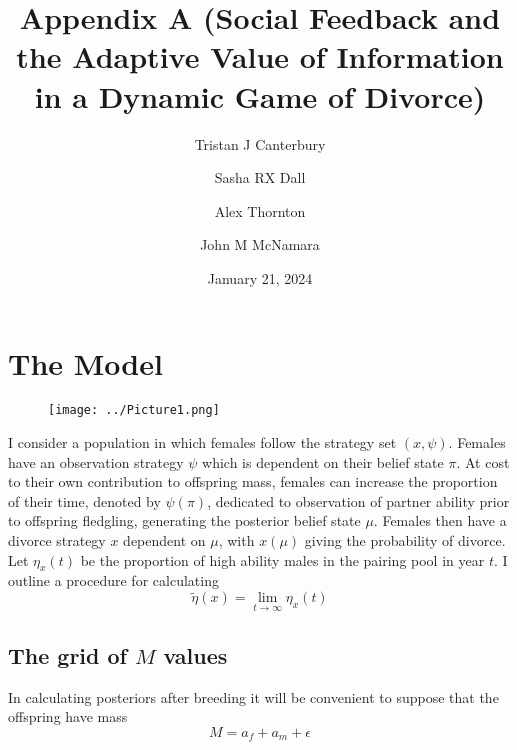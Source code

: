 \documentclass[10pt]{article}
\begin{document}
\title{\textbf{Appendix A (Social Feedback and the Adaptive Value of Information in a Dynamic Game of Divorce)}}

\author[1]{Tristan J Canterbury}%
\author[1]{Sasha RX Dall}%
\author[1]{Alex Thornton}%
\author[2]{John M McNamara}%
%
%
\vspace{-1em}
\date{January 21, 2024}

\begingroup
\let\center\flushleft
\let\endcenter\endflushleft
\maketitle
\endgroup



\section{The Model}

\begin{figure}
	\centering
	\texttt{[image: ../Picture1.png]}
\end{figure}

I consider a population in which females follow the strategy set $(x,\psi)$.
Females have an observation strategy $\psi$ which is dependent on
their belief state $\pi$. At cost to their own contribution to offspring
mass, females can increase the proportion of their time, denoted by
$\psi(\pi)$, dedicated to observation of partner ability prior to
offspring fledgling, generating the posterior belief state $\mu$.
Females then have a divorce strategy $x$ dependent on $\mu$, with
$x(\mu)$ giving the probability of divorce. Let $\eta_{x}(t)$ be
the proportion of high ability males in the pairing pool in year $t$.
I outline a procedure for calculating 
\begin{equation}
	\tilde{\eta}(x)=\underset{t\rightarrow\infty}{\lim}\eta_{x}(t)\label{eq:}
\end{equation}


\subsection{The grid of $M$ values }

In calculating posteriors after breeding it will be convenient to
suppose that the offspring have mass
\begin{equation}
	M=a_{f}+a_{m}+\epsilon\label{eq:-1}
\end{equation}
\end{document}
